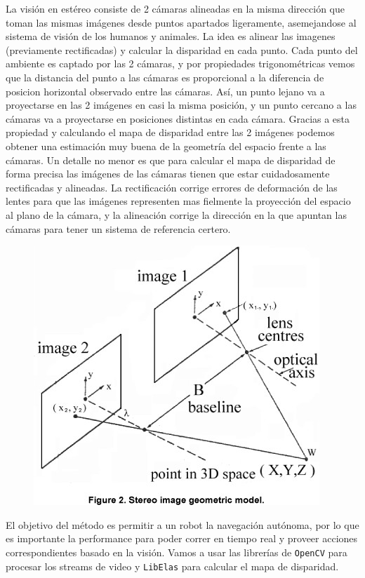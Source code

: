 \documentclass[journal,a4paper]{IEEEtran}
\begin{document}
La visión en estéreo consiste de 2 cámaras alineadas en la misma dirección que toman las mismas imágenes desde puntos apartados ligeramente,
asemejandose al sistema de visión de los humanos y animales.
La idea es alinear las imagenes (previamente rectificadas) y calcular la disparidad en cada punto.
Cada punto del ambiente es captado por las 2 cámaras, y por propiedades trigonométricas vemos que la distancia del punto a las cámaras es proporcional a la diferencia de posicion horizontal observado entre las cámaras.
Así, un punto lejano va a proyectarse en las 2 imágenes en casi la misma posición, y un punto cercano a las cámaras va a proyectarse en posiciones distintas en cada cámara. 
Gracias a esta propiedad y calculando el mapa de disparidad entre las 2 imágenes podemos obtener una estimación muy buena de la geometría del espacio frente a las cámaras.
Un detalle no menor es que para calcular el mapa de disparidad de forma precisa las imágenes de las cámaras tienen que estar cuidadosamente rectificadas y alineadas. La rectificación corrige errores de deformación de las lentes para que las imágenes representen mas fielmente la proyección del espacio al plano de la cámara, y la alineación corrige la dirección en la que apuntan las cámaras para tener un sistema de referencia certero.

\begin{figure}[h!]
    \centering
    \includegraphics[width=0.9\linewidth]{stereo.jpg}
\end{figure}

El objetivo del método es permitir a un robot la navegación autónoma, por lo que es importante la performance para poder correr en tiempo real y proveer acciones correspondientes basado en la visión. Vamos a usar las librerías de \texttt{OpenCV} para procesar los streams de video y \texttt{LibElas} para calcular el mapa de disparidad.
\end{document}
